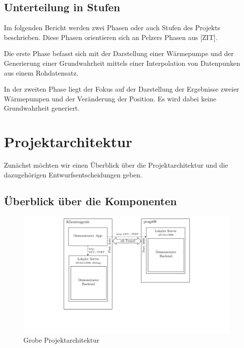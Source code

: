 \documentclass[a4paper]{extarticle}
\begin{document}
    \subsection{Unterteilung in Stufen}
    
    Im folgenden Bericht werden zwei Phasen oder auch Stufen des Projekts beschrieben.
    Diese Phasen orientieren sich an Pelzers Phasen aus [ZIT]. 

    Die erste Phase befasst sich mit der Darstellung einer Wärmepumpe und der Generierung einer Grundwahrheit mittels einer Interpolation von Datenpunken aus einem Rohdatensatz.

    In der zweiten Phase liegt der Fokus auf der Darstellung der Ergebnisse zweier Wärmepumpen und der Veränderung der Position. 
    Es wird dabei keine Grundwahrheit generiert. 

    \section{Projektarchitektur}

    Zunächst möchten wir einen Überblick über die Projektarchitektur und die dazugehörigen Entwurfsentscheidungen geben.
    
    \subsection{Überblick über die Komponenten}

    \begin{figure}[H]
        \centering
        \includegraphics[trim={5cm 3.5cm 5cm 0}, clip, width=0.8\linewidth]{bilder/architektur_projekt.pdf}
        \caption{Grobe Projektarchitektur} \label{fig:architektur-projekt}
    \end{figure}
\end{document}
